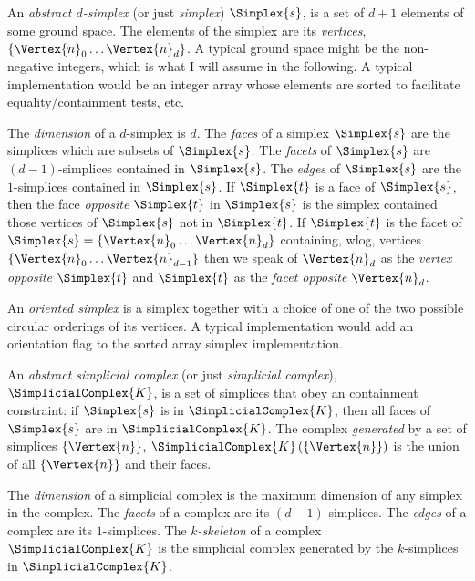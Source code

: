 \label{sec:simplicial-meshes}

An {\it abstract $d$-simplex} (or just {\it simplex})
$\Simplex{s}$, is a set of $d+1$ elements of some ground space.
The elements of the simplex are its {\it vertices}, 
$\{ \Vertex{n}_0 \ldots \Vertex{n}_d \}$.
A typical ground space might be the non-negative integers,
which is what I will assume in the following.
A typical implementation would be an integer array
whose elements are sorted to facilitate equality/containment tests, etc.

The {\it dimension} of a $d$-simplex is $d$.
The {\it faces} of a simplex $\Simplex{s}$ are the simplices which are subsets of $\Simplex{s}$.
The {\it facets} of $\Simplex{s}$ are $(d-1)$-simplices contained in $\Simplex{s}$.
The {\it edges} of $\Simplex{s}$ are the $1$-simplices contained in $\Simplex{s}$.
If $\Simplex{t}$ is a face of $\Simplex{s}$,
then the face {\it opposite} $\Simplex{t}$ in $\Simplex{s}$
is the simplex contained those vertices of $\Simplex{s}$
not in $\Simplex{t}$.
If $\Simplex{t}$ is the facet of $\Simplex{s} = \{ \Vertex{n}_0 \ldots \Vertex{n}_d \}$
containing, wlog, vertices $\{ \Vertex{n}_0 \ldots \Vertex{n}_{d-1} \}$
then we speak of $\Vertex{n}_d$ as the {\it vertex opposite} $\Simplex{t}$
and $\Simplex{t}$ as the {\it facet opposite} $\Vertex{n}_d$.

An {\it oriented simplex} is a simplex together with a choice
of one of the two possible circular orderings of its vertices.
A typical implementation would add an orientation flag
to the sorted array simplex implementation.

An {\it abstract simplicial complex} (or just {\it simplicial complex}),
$\SimplicialComplex{K}$, is a set of simplices
that obey an containment constraint:
if $\Simplex{s}$ is in $\SimplicialComplex{K}$, 
then all faces of $\Simplex{s}$ are in $\SimplicialComplex{K}$.
The complex {\it generated} by a set of simplices $\{ \Vertex{n} \}$,
$\SimplicialComplex{K} \left( \{ \Vertex{n} \} \right)$ 
is the union of all $\{ \Vertex{n} \}$
and their faces.

The {\it dimension} of a simplicial complex is the maximum dimension
of any simplex in the complex.
The {\it facets} of a complex are its $(d-1)$-simplices.
The {\it edges} of a complex are its $1$-simplices.
The {\it $k$-skeleton} of a complex $\SimplicialComplex{K}$
is the simplicial complex generated by the $k$-simplices in $\SimplicialComplex{K}$.

